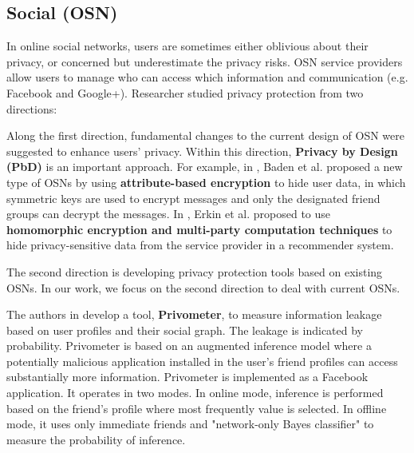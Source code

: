 \subsection{Social (OSN)}

In online social networks,
	users are sometimes either oblivious about their privacy,
	or concerned but underestimate the privacy risks.
OSN service providers allow users to manage who can access which information and communication (e.g. Facebook and Google+).
Researcher studied privacy protection from two directions:

Along the first direction,
	fundamental changes to the current design of OSN were suggested to enhance users' privacy.
Within this direction, \textbf{Privacy by Design (PbD)} is an important approach.
For example,
	in \cite{baden_persona_2009},
	Baden et al. proposed a new type of OSNs by using \textbf{attribute-based encryption} to hide user data,
	in which symmetric keys are used to encrypt messages and only the designated friend groups can decrypt the messages.
In \cite{erkin_generating_2011},
	Erkin et al. proposed to use \textbf{homomorphic encryption and multi-party computation techniques} to hide privacy-sensitive data from the service provider in a recommender system.

The second direction is developing privacy protection tools based on existing OSNs.
In our work,
	we focus on the second direction to deal with current OSNs.


The authors in \cite{talukder_privometer_2010} develop a tool,
	\textbf{Privometer},
	to measure information leakage based on user profiles and their social graph.
The leakage is indicated by probability.
Privometer is based on an augmented inference model where a potentially malicious application installed in the user’s friend profiles can access substantially more information.
Privometer is implemented as a Facebook application.
It operates in two modes.
In online mode,
	inference is performed based on the friend’s profile where most frequently value is selected.
In offline mode,
	it uses only immediate friends and "network-only Bayes classifier" to measure the probability of inference.

